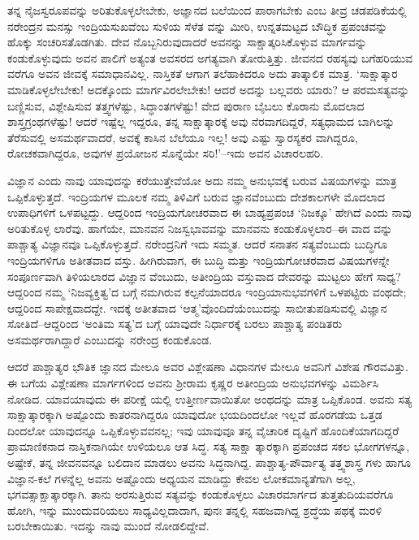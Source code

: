 ತನ್ನ ನೈಜಸ್ವರೂಪವನ್ನು ಅರಿತುಕೊಳ್ಳಲೇಬೇಕು, ಅಜ್ಞಾನದ ಬಲೆಯಿಂದ ಪಾರಾಗಬೇಕು ಎಂಬ ತೀವ್ರ ಚಡಪಡಿಕೆಯಲ್ಲಿ ನರೇಂದ್ರನ ಮನಸ್ಸು ಇಂದ್ರಿಯಸುಖವೆಂಬ ಸುಳಿಯ ಸೆಳೆತ ವನ್ನು ಮೀರಿ, ಉನ್ನತಮಟ್ಟದ ಬೌದ್ಧಿಕ ಪ್ರಪಂಚವನ್ನು ಹೊಕ್ಕು ಸಂಚರಿಸತೊಡಗಿತು. ದೇವ ನೊಬ್ಬನಿರುವುದಾದರೆ ಅವನನ್ನು ಸಾಕ್ಷಾತ್ಕರಿಸಿಕೊಳ್ಳುವ ಮಾರ್ಗವನ್ನು ಕಂಡುಕೊಳ್ಳುವುದು ಅವನ ಪಾಲಿಗೆ ಅತ್ಯಂತ ಅವಸರದ ಅಗತ್ಯವಾಗಿ ತೋರುತ್ತಿತ್ತು. ಜೀವನದ ರಹಸ್ಯವು ಬಗೆಹರಿಯುವ ವರೆಗೂ ಅವನ ಜೀವಕ್ಕೆ ಸಮಾಧಾನವಿಲ್ಲ. ನಾಸ್ತಿಕತೆ ಆಗಾಗ ತಲೆಹಾಕಿದರೂ ಅದು ತಾತ್ಕಾಲಿಕ ಮಾತ್ರ. ‘ಸಾಕ್ಷಾತ್ಕಾರ ಮಾಡಿಕೊಳ್ಳಲೇಬೇಕು! ಅದಕ್ಕೊಂದು ಮಾರ್ಗವಿರಲೇಬೇಕು! ಆದರೆ ಅದನ್ನು ಬಲ್ಲವರು ಯಾರು? ಆ ಪರಮಸತ್ಯವನ್ನು ಬಣ್ಣಿಸುವ, ವಿಶ್ಲೇಷಿಸುವ ತತ್ತ್ವಗಳೆಷ್ಟು, ಸಿದ್ಧಾಂತಗಳೆಷ್ಟು! ವೇದ ಪುರಾಣ ಬೈಬಲು ಕೊರಾನು ಮೊದಲಾದ ಶಾಸ್ತ್ರಗ್ರಂಥಗಳೆಷ್ಟು! ಆದರೆ ಇಷ್ಟೆಲ್ಲ ಇದ್ದರೂ, ತನ್ನ ಸಾಕ್ಷಾತ್ಕಾರಕ್ಕೆ ಅವು ನೆರವಾಗದಿದ್ದರೆ, ಸತ್ಯಧಾಮದ ಬಾಗಿಲನ್ನು ತೆರೆಸುವಲ್ಲಿ ಅಸಮರ್ಥವಾದರೆ, ಅವಕ್ಕೆ ಕಾಸಿನ ಬೆಲೆಯೂ ಇಲ್ಲ! ಅವು ಎಷ್ಟು ಸ್ವಾರಸ್ಯಕರ ವಾಗಿದ್ದರೂ, ರೋಚಕವಾಗಿದ್ದರೂ, ಅವುಗಳ ಪ್ರಯೋಜನ ಸೊನ್ನೆಯೇ ಸರಿ!’–ಇದು ಅವನ ವಿಚಾರಲಹರಿ.

ವಿಜ್ಞಾನ ಎಂದು ನಾವು ಯಾವುದನ್ನು ಕರೆಯುತ್ತೇವೆಯೋ ಅದು ನಮ್ಮ ಅನುಭವಕ್ಕೆ ಬರುವ ವಿಷಯಗಳನ್ನು ಮಾತ್ರ ಒಪ್ಪಿಕೊಳ್ಳುತ್ತದೆ. ಇಂದ್ರಿಯಗಳ ಮೂಲಕ ನಮ್ಮ ತಿಳಿವಿಗೆ ಬರುವ ಜ್ಞಾನವೆಂಬುದು ದೇಶಕಾಲಗಳೇ ಮೊದಲಾದ ಉಪಾಧಿಗಳಿಗೆ ಒಳಪಟ್ಟದ್ದು. ಆದ್ದರಿಂದ ಇಂದ್ರಿಯಗೋಚರವಾದ ಈ ಬಾಹ್ಯಪ್ರಪಂಚ ‘ನಿಜಕ್ಕೂ’ ಹೇಗಿದೆ ಎಂದು ನಾವು ಅರಿತುಕೊಳ್ಳ ಲಾರೆವು. ಹಾಗೆಯೇ, ಮಾನವನ ನಿಜಸ್ವಭಾವವನ್ನು ಮಾನವನು ಕಂಡುಕೊಳ್ಳಲಾರ–ಈ ವಾದ ವನ್ನು ಪಾಶ್ಚಾತ್ಯ ವಿಜ್ಞಾನವೂ ಒಪ್ಪಿಕೊಳ್ಳುತ್ತದೆ. ನರೇಂದ್ರನಿಗೆ ಇದು ಸಮ್ಮತ. ಆದರೆ ಸನಾತನ ಸತ್ಯವೆಂಬುದು ಬುದ್ಧಿಗೂ ಇಂದ್ರಿಯಗಳಿಗೂ ಅತೀತವಾದ ವಸ್ತು. ಹೀಗಿರುವಾಗ, ಈ ಬುದ್ಧಿ ಮತ್ತು ಇಂದ್ರಿಯಗೋಚರವಾದ ವಿಷಯಗಳನ್ನೇ ಸಂಪೂರ್ಣವಾಗಿ ತಿಳಿಯಲಾರದ ವಿಜ್ಞಾನ ವೆಂಬುದು, ಅತೀಂದ್ರಿಯ ವಸ್ತುವಾದ ದೇವರನ್ನು ಮುಟ್ಟಲು ಹೇಗೆ ಸಾಧ್ಯ? ಆದ್ದರಿಂದ ನಮ್ಮ ‘ನಿಜವ್ಯಕ್ತಿತ್ವ’ದ ಬಗ್ಗೆ ನಮಗಿರುವ ಕಲ್ಪನೆಯಾದರೂ ಇಂದ್ರಿಯಾನುಭವಗಳಿಗೆ ಒಳಪಟ್ಟಿರು ವಂಥದೇ; ಆದ್ದರಿಂದ ಸಾಪೇಕ್ಷವಾದದ್ದೇ. ಇದಕ್ಕೆ ಅತೀತವಾದ ‘ಆತ್ಮ’ವೊಂದಿದೆಯೆಂಬುದನ್ನು ಸಾಬೀತುಪಡಿಸುವಲ್ಲಿ ವಿಜ್ಞಾನ ಸೋತಿದೆ–ಆದ್ದರಿಂದ ‘ಅಂತಿಮ ಸತ್ಯ’ದ ಬಗ್ಗೆ ಯಾವುದೇ ನಿರ್ಧಾರಕ್ಕೆ ಬರಲು ಪಾಶ್ಚಾತ್ಯ ಪಂಡಿತರು ಅಸಮರ್ಥರಾಗಿದ್ದಾರೆ ಎಂಬುದನ್ನು ನರೇಂದ್ರ ಕಂಡುಕೊಂಡ. 

ಆದರೆ ಪಾಶ್ಚಾತ್ಯರ ಭೌತಿಕ ಜ್ಞಾನದ ಮೇಲೂ ಅವರ ವಿಶ್ಲೇಷಣಾ ವಿಧಾನಗಳ ಮೇಲೂ ಅವನಿಗೆ ವಿಶೇಷ ಗೌರವವಿತ್ತು. ಈ ಬಗೆಯ ವಿಶ್ಲೇಷಣಾ ಮಾರ್ಗಗಳಿಂದ ಅವನು ಶ್ರೀರಾಮ ಕೃಷ್ಣರ ಅತೀಂದ್ರಿಯ ಅನುಭವಗಳನ್ನು ವಿಮರ್ಶಿಸಿ ನೋಡಿದ. ಯಾವಯಾವುದು ಈ ಪರೀಕ್ಷೆ ಯಲ್ಲಿ ಉತ್ತೀರ್ಣವಾಯಿತೋ ಅಂಥದನ್ನು ಮಾತ್ರ ಒಪ್ಪಿಕೊಂಡ. ಅವನು ಸತ್ಯ ಸಾಕ್ಷಾತ್ಕಾರಕ್ಕಾಗಿ ಅಷ್ಟೊಂದು ಕಾತರನಾಗಿದ್ದರೂ ಯಾವುದೋ ಭಯದಿಂದಲೋ ಇಲ್ಲವೆ ಹೊರಗಡೆಯ ಒತ್ತಡ ದಿಂದಲೋ ಯಾವುದನ್ನೂ ಒಪ್ಪಿಕೊಳ್ಳುವವನಲ್ಲ; ಇವು ಯಾವುವೂ ತನ್ನ ವೈಚಾರಿಕ ದೃಷ್ಟಿಗೆ ಹೊಂದಿಕೆಯಾಗದಿದ್ದರೆ ಪ್ರಾಮಾಣಿಕನಾದ ನಾಸ್ತಿಕನಾಗಿಯೇ ಉಳಿಯಲೂ ಆತ ಸಿದ್ಧ. ಸತ್ಯ ಸಾಕ್ಷಾ ತ್ಕಾರಕ್ಕಾಗಿ ಪ್ರಪಂಚದ ಸಕಲ ಭೋಗಗಳನ್ನೂ, ಅಷ್ಟೇಕೆ, ತನ್ನ ಜೀವನವನ್ನೂ ಬಲಿದಾನ ಮಾಡಲು ಅವನು ಸಿದ್ಧನಾಗಿದ್ದ. ಪಾಶ್ಚಾತ್ಯ-ಪೌರ್ವಾತ್ಯ ತತ್ತ್ವಶಾಸ್ತ್ರ ಗಳು ಹಾಗೂ ವಿಜ್ಞಾನ-ಕಲೆ ಗಳನ್ನೆಲ್ಲ ಅವನು ಅಷ್ಟೊಂದು ಅಧ್ಯಯನ ಮಾಡಿದ್ದು ಕೇವಲ ಲೋಕಮಾನ್ಯತೆಗಾಗಿ ಅಲ್ಲ, ಭಗವತ್ಸಾಕ್ಷಾತ್ಕಾರಕ್ಕಾಗಿ. ತಾನು ಅರಸುತ್ತಿರುವ ಸತ್ಯವನ್ನು ಕಂಡುಕೊಳ್ಳಲು ವಿಚಾರಮಾರ್ಗದ ತುತ್ತತುದಿಯವರೆಗೂ ಹೋಗಿ, ಇನ್ನು ಮುಂದುವರಿಯಲು ಸಾಧ್ಯವಿಲ್ಲದಾದಾಗ, ಪುನಃ ತನ್ನಲ್ಲಿ ಸಹಜವಾಗಿದ್ದ ಶ್ರದ್ಧೆಯ ಪಥಕ್ಕೆ ಮರಳಿ ಬರಬೇಕಾಯಿತು. ಇದನ್ನು ನಾವು ಮುಂದೆ ನೋಡಲಿದ್ದೇವೆ.

